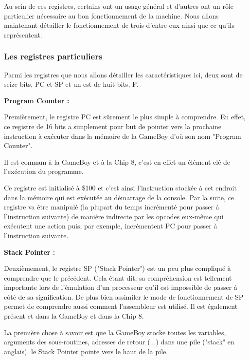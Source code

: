 \documentclass[12pt, a4paper]{article}
\begin{document}
\pagebreak

Au sein de ces registres, certains ont un usage général et d'autres ont un rôle particulier nécessaire au bon fonctionnement de la machine. Nous allons maintenant détailler le fonctionnement de trois d'entre eux ainsi que ce qu'ils représentent.

\subsubsection{Les registres particuliers}

Parmi les registres que nous allons détailler les caractéristiques ici, deux sont de seize bits, PC et SP et un est de huit bits, F.

\bigskip
\begin{center}{\bf Program Counter :}\end{center}
Premièrement, le registre PC est sûrement le plus simple à comprendre. En effet, ce registre de 16 bits a simplement pour but de pointer vers la prochaine instruction à exécuter dans la mémoire de la GameBoy d'où son nom "Program Counter". 

Il est commun à la GameBoy et à la Chip 8, c'est en effet un élément clé de l'exécution du programme.

\bigskip

Ce registre est initialisé à \$100 et c'est ainsi l'instruction stockée à cet endroit dans la mémoire qui est exécutée au démarrage de la console. Par la suite, ce registre va être manipulé (la plupart du temps incrémenté pour passer à l'instruction suivante) de manière indirecte par les opcodes eux-même qui exécutent une action puis, par exemple, incrémentent PC pour passer à l'instruction suivante.

\pagebreak
\bigskip
\begin{center}{\bf Stack Pointer :}\end{center}
Deuxièmement, le registre SP ("Stack Pointer") est un peu plus compliqué à comprendre que le précédent. Cela étant dit, sa compréhension est tellement importante lors de l'émulation d'un processeur qu'il est impossible de passer à côté de sa signification. De plus bien assimiler le mode de fonctionnement de SP permet de comprendre aussi comment l'assembleur est utilisé. Il est également présent et dans la GameBoy et dans la Chip 8.

\bigskip

La première chose à savoir est que la GameBoy stocke toutes les variables, arguments des sous-routines, adresses de retour (...) dans une pile ("stack" en anglais). le Stack Pointer pointe vers le haut de la pile. 
\end{document}
